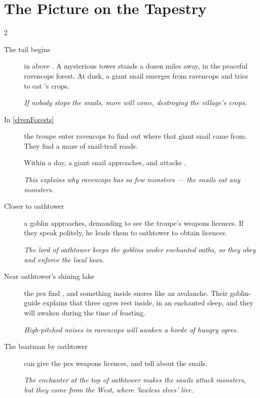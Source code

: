 \enchantedMap

\section*{The Picture on the Tapestry}

\begin{multicols}{2}

\begin{description}
  \item[The tail begins]
  in  above .
  A mysterious tower stands a dozen miles away, in the peaceful \gls{ravencops} forest.
  At dusk, a giant snail emerges from \gls{ravencops} and tries to eat 's crops.

  \textit{If nobody stops the snails, more will come, destroying the \gls{village}'s crops.}

  \item[In \autoref{elvenForests}]
  the troupe enter \gls{ravencops} to find out where that giant snail came from.
  They find a maze of snail-trail roads.

  Within a day, a giant snail approaches, and attacks .

  \textit{This explains why \gls{ravencops} has so few monsters --- the snails eat any \glspl{monster}.}

  \item[Closer to \gls{oathtower}]
  a goblin approaches, demanding to see the troupe's weapons licences.
  If they speak politely, he leads them to \gls{oathtower} to obtain licences.

  \textit{The lord of \gls{oathtower} keeps the goblins under enchanted oaths, so they obey and enforce the local laws.}

  \item[Near \gls{oathtower}'s shining lake]
  the \glspl{pc} find , and something inside snores like an avalanche.
  Their goblin-guide explains that three \glspl{ogre} rest inside, in an enchanted sleep, and they will awaken during the time of feasting.

  \textit{High-pitched noises in \gls{ravencops} will awaken a horde of hungry \glspl{ogre}.}

  \item[The boatman by \gls{oathtower}]
  can give the \glspl{pc} weapons licences, and tell about the snails.

  \textit{The enchanter at the top of \gls{oathtower} makes the snails attack \glspl{monster}, but they come from the West, where `lawless elves' live.}


\end{description}
\end{multicols}
